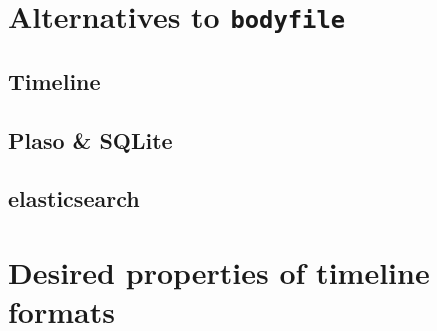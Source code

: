 \documentclass[twocolumn]{article}
\newcommand{\bodyfile}{\texttt{bodyfile}}
\begin{document}
\section{Alternatives to \bodyfile}

\subsection{Timeline}

\subsection{Plaso \& SQLite}

\subsection{elasticsearch}

\section{Desired properties of timeline formats}



\end{document}
